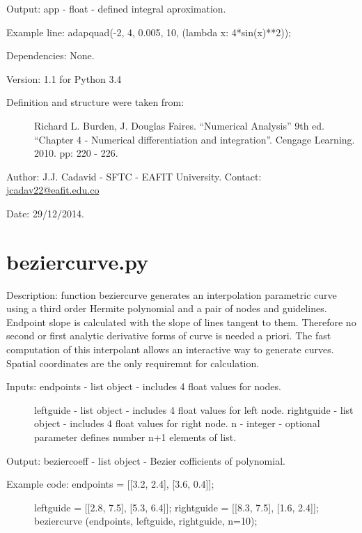 \documentclass[letterpaper,10pt,oneside]{sphinxmanual}
\theoremstyle{plain}%
\theoremstyle{definition}%
\theoremstyle{remark}%
\begin{document}
Output: app - float - defined integral aproximation.

Example line: adapquad(-2, 4, 0.005, 10, (lambda x: 4*sin(x)**2));

Dependencies: None.

Version: 1.1 for Python 3.4
\begin{description}
\item[{Definition and structure were taken from:}] \leavevmode
Richard L. Burden, J. Douglas Faires. ``Numerical Analysis'' 9th ed.
``Chapter 4 - Numerical differentiation and integration''. 
Cengage Learning. 2010. pp: 220 - 226.

\end{description}

Author: J.J. Cadavid - SFTC - EAFIT University.
Contact: \href{mailto:jcadav22@eafit.edu.co}{jcadav22@eafit.edu.co}

Date: 29/12/2014.


\section{beziercurve.py}
\label{code:beziercurve-py}\label{code:module-beziercurve}
Description: function beziercurve generates an interpolation parametric
curve using a third order Hermite polynomial and a pair of nodes and
guidelines. Endpoint slope is calculated with the slope of lines
tangent to them. Therefore no second or first analytic derivative 
forms of curve is needed a priori. The fast computation of this interpolant
allows an interactive way to generate curves. Spatial coordinates are
the only requiremnt for calculation.
\begin{description}
\item[{Inputs: endpoints - list object - includes 4 float values for nodes.}] \leavevmode
leftguide - list object - includes 4 float values for left node.
rightguide - list object - includes 4 float values for right node.
n - integer - optional parameter defines number n+1 elements of list.

\end{description}

Output: beziercoeff - list object - Bezier cofficients of polynomial.
\begin{description}
\item[{Example code: endpoints = {[}{[}3.2, 2.4{]}, {[}3.6, 0.4{]}{]};}] \leavevmode
leftguide = {[}{[}2.8, 7.5{]}, {[}5.3, 6.4{]}{]};
rightguide = {[}{[}8.3, 7.5{]}, {[}1.6, 2.4{]}{]};
beziercurve (endpoints, leftguide, rightguide, n=10);

\end{description}
\end{document}
